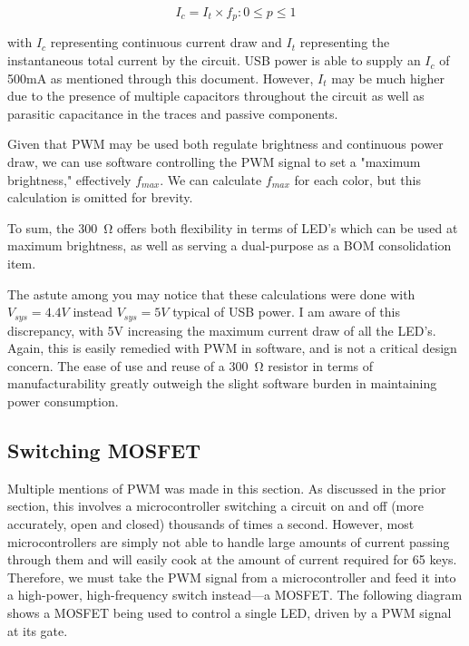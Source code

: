 \documentclass[11pt]{article}
\begin{document}
$$ I_{c} = I_{t} \times f_{p} : 0 \le p \le 1 $$

with \(I_c\) representing continuous current draw and \(I_t\) representing the instantaneous total current by the circuit. USB power is able to supply an \(I_c\) of 500mA as mentioned through this document. However, \(I_t\) may be much higher due to the presence of multiple capacitors throughout the circuit as well as parasitic capacitance in the traces and passive components.\footnotemark {} 


Given that PWM may be used both regulate brightness and continuous power draw, we can use software controlling the PWM signal to set a "maximum brightness," effectively \(f_{max}\). We can calculate \(f_{max}\) for each color, but this calculation is omitted for brevity.

To sum, the \SI{300}{\ohm} offers both flexibility in terms of LED's which can be used at maximum brightness, as well as serving a dual-purpose as a BOM consolidation item.

The astute among you may notice that these calculations were done with \(V_{sys} = 4.4V\) instead \(V_{sys} = 5V\) typical of USB power. I am aware of this discrepancy, with 5V increasing the maximum current draw of all the LED's. Again, this is easily remedied with PWM in software, and is not a critical design concern. The ease of use and reuse of a \SI{300}{\ohm} resistor in terms of manufacturability greatly outweigh the slight software burden in maintaining power consumption.

\subsection{Switching MOSFET}

Multiple mentions of PWM was made in this section. As discussed in the prior section, this involves a microcontroller switching a circuit on and off (more accurately, open and closed) thousands of times a second. However, most microcontrollers are simply not able to handle large amounts of current passing through them and will easily cook at the amount of current required for 65 keys. Therefore, we must take the PWM signal from a microcontroller and feed it into a high-power, high-frequency switch instead—a MOSFET. The following diagram shows a MOSFET being used to control a single LED, driven by a PWM signal at its gate. 
\end{document}
